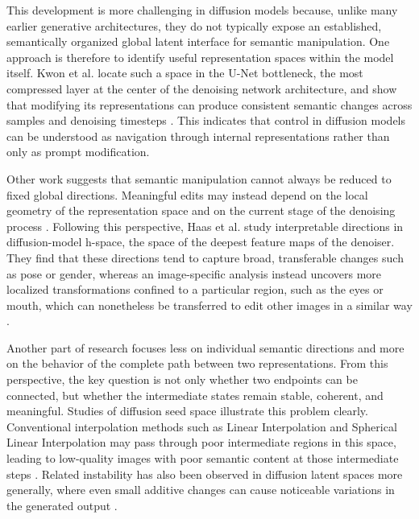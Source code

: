 This development is more challenging in diffusion models because, unlike many earlier generative architectures, they do not typically expose an established, semantically organized global latent interface for semantic manipulation. One approach is therefore to identify useful representation spaces within the model itself. Kwon et al. locate such a space in the U-Net bottleneck, the most compressed layer at the center of the denoising network architecture, and show that modifying its representations can produce consistent semantic changes across samples and denoising timesteps \cite{kwon2023semantic}. This indicates that control in diffusion models can be understood as navigation through internal representations rather than only as prompt modification.

Other work suggests that semantic manipulation cannot always be reduced to fixed global directions. Meaningful edits may instead depend on the local geometry of the representation space and on the current stage of the denoising process \cite{park2023riemannian}. Following this perspective, Haas et al. study interpretable directions in diffusion-model h-space, the space of the deepest feature maps of the denoiser. They find that these directions tend to capture broad, transferable changes such as pose or gender, whereas an image-specific analysis instead uncovers more localized transformations confined to a particular region, such as the eyes or mouth, which can nonetheless be transferred to edit other images in a similar way \cite{haas2024interpretable}.

Another part of research focuses less on individual semantic directions and more on the behavior of the complete path between two representations. From this perspective, the key question is not only whether two endpoints can be connected, but whether the intermediate states remain stable, coherent, and meaningful. Studies of diffusion seed space illustrate this problem clearly. Conventional interpolation methods such as Linear Interpolation and Spherical Linear Interpolation may pass through poor intermediate regions in this space, leading to low-quality images with poor semantic content at those intermediate steps \cite{samuel2023normguided}. Related instability has also been observed in diffusion latent spaces more generally, where even small additive changes can cause noticeable variations in the generated output \cite{guo2023smooth}.

